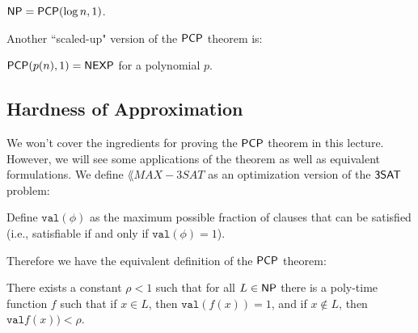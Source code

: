 \begin{theorem}
${\mathsf{NP}} = {\mathsf{PCP}}(\log n, 1)$.
\end{theorem}

Another ``scaled-up" version of the ${\mathsf{PCP}}$ theorem is:
\begin{theorem}
${\mathsf{PCP}}(p(n), 1) = {\mathsf{NEXP}}$ for a polynomial $p$.
\end{theorem}

\subsection{Hardness of Approximation}
\newcommand{\MAXThreeSAT}{\lang{MAX-3SAT}}
We won't cover the ingredients for proving the ${\mathsf{PCP}}$ theorem in this lecture. However, we will see some applications of the theorem as well as equivalent formulations. We define $\MAXThreeSAT$ as an optimization version of the ${\mathsf{3SAT}}$ problem:

\begin{definition}
Define $\texttt{val}(\phi)$ as the maximum possible fraction of clauses that can be satisfied (i.e., satisfiable if and only if $\texttt{val}(\phi) = 1$).
\end{definition}

Therefore we have the equivalent definition of the ${\mathsf{PCP}}$ theorem:
\begin{theorem}
There exists a constant $\rho < 1$ such that for all $L \in {\ensuremath{\mathsf{NP}}}$ there is a poly-time function $f$ such that if $x \in L$, then $\texttt{val}(f(x)) = 1$, and if $x \notin L$, then $\texttt{val}f(x)) < \rho$.
\end{theorem}